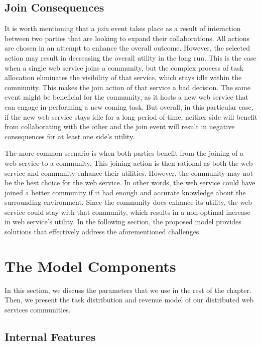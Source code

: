 \subsection{Join Consequences}\label{s:jc}
It is worth mentioning that a \emph{join} event takes place as a result of interaction between two parties that are looking to expand their collaborations. All actions are chosen in an attempt to enhance the overall outcome. However, the selected action may result in decreasing the overall utility in the long run.
This is the case when a single web service joins a community, but the complex process of task allocation eliminates the visibility of that service, which stays idle within the community. This makes the join action of that service a bad decision. The same event might be beneficial for the community, as it hosts a new web service that can engage in performing a new coming task. But overall, in this particular case, if the new web service stays idle for a long period of time, neither side will benefit from collaborating with the other and the join event will result in negative consequences for at least one side's utility.

The more common scenario is when both parties benefit from the joining of a web service to a community. This joining action is then rational as both the web service and community enhance their utilities. However, the community may not be the best choice for the web service. In other words, the web service could have joined a better community if it had enough and accurate knowledge about the surrounding environment. Since the community does enhance its utility, the web service could stay with that community, which results in a non-optimal increase in web service's utility. In the following section, the proposed model provides solutions that effectively address the aforementioned challenges.

\section{The Model Components}\label{s:themodelcomponents}

In this section, we discuss the parameters that we use in the rest of the chapter. Then, we present the task distribution and revenue model of our distributed web services communities.

\subsection{Internal Features}\label{s:if}

